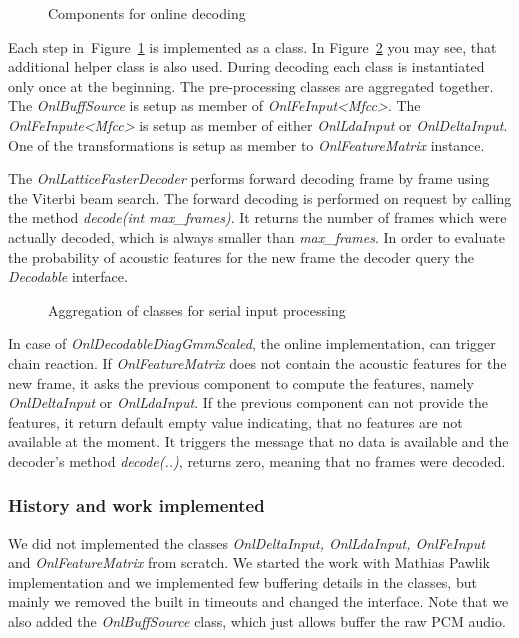 \begin{figure}[!htp]
    \begin{center}
        
        \caption{Components for online decoding}
    \label{fig:online_pipeline} 
    \end{center}
\end{figure}

Each step in~Figure~\ref{fig:online_pipeline} is implemented as a class.
In Figure~\ref{fig:classes} you may see, that additional helper class is also used.
During decoding each class is instantiated only once at the beginning.
The pre-processing classes are aggregated together. 
The {\it OnlBuffSource}\/ is setup as member of {\it OnlFeInput<Mfcc>}\/.
The {\it OnlFeInpute<Mfcc>}\/ is setup as member of either {\it OnlLdaInput}\/ or {\it OnlDeltaInput}\/.
One of the transformations is setup as member to {\it OnlFeatureMatrix}\/ instance.

The {\it OnlLatticeFasterDecoder}\/ performs forward decoding frame by frame using the Viterbi beam search.
The forward decoding is performed on request by calling the method {\it decode(int max\_frames)}.
It returns the number of frames which were actually decoded, which is always smaller than {\it max\_frames}.
In order to evaluate the probability of acoustic features for the new frame
the decoder query the {\it Decodable}\/ interface.

\begin{figure}[!htp]
    \begin{center}
        
    \caption{Aggregation of classes for serial input processing}
    \label{fig:classes} 
    \end{center}
\end{figure}

In case of {\it OnlDecodableDiagGmmScaled}, the online implementation, can trigger chain reaction.
If {\it OnlFeatureMatrix}\/ does not contain the acoustic features for the new frame, it asks
the previous component to compute the features, namely {\it OnlDeltaInput}\/ or {\it OnlLdaInput}\/.
If the previous component can not provide the features, it return default empty value indicating,
that no features are not available at the moment. It triggers the message that no data is available
and the decoder's method {\it decode(..)}, returns zero, meaning that no frames were decoded.

\subsubsection{History and work implemented}
\label{ssub:history}
We did not implemented the classes {\it OnlDeltaInput, OnlLdaInput, OnlFeInput}\/ and {\it OnlFeatureMatrix}\/
from scratch. We started the work with Mathias Pawlik implementation and we implemented few buffering details
in the classes, but mainly we removed the built in timeouts and changed the interface.
Note that we also added the {\it OnlBuffSource}\/ class, which just allows buffer the raw \ac{PCM} audio.

